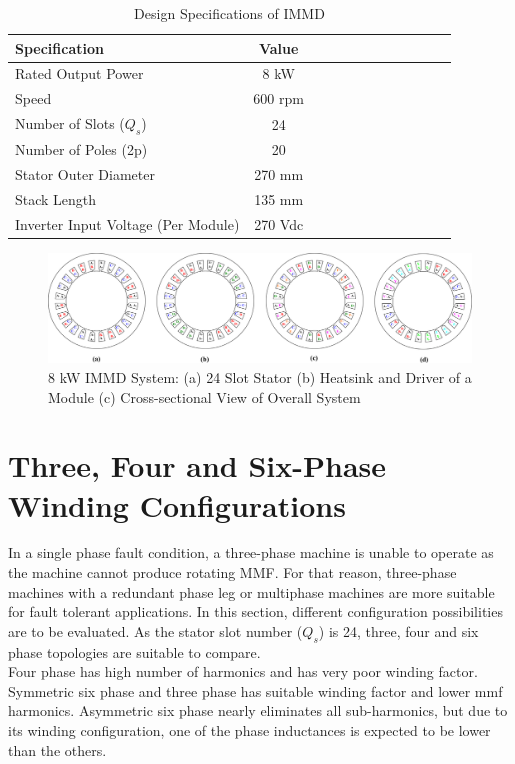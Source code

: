 \documentclass[a4paper,11pt]{article}
\begin{document}
\begin{table}[ht!]
\centering
 \caption{Design Specifications of IMMD}
\label{kd}
\begin{tabularx}{0.5\textwidth}{@{}l*{10}{C}c@{}}

\toprule
Specification  &  Value \\ 
\midrule
Rated Output Power & 8 kW \\ 
Speed & 600 rpm \\ 
Number of Slots ($Q_s$) & 24 \\
Number of Poles (2p) & 20 \\
Stator Outer Diameter & 270 mm \\
Stack Length & 135 mm \\
Inverter Input Voltage (Per Module) & 270 Vdc \\

\bottomrule
\end{tabularx}
\end{table}

\begin{figure}[ht!]
    \centering
    \includegraphics{windings.png}
    \caption{8 kW IMMD System: (a) 24 Slot Stator (b) Heatsink and Driver of a Module (c) Cross-sectional View of Overall System}
    \label{fig:immd}
\end{figure}

\section{\normalsize\textbf{Three, Four and Six-Phase Winding Configurations}}
In a single phase fault condition, a three-phase machine is unable to operate as the machine cannot produce rotating MMF. For that reason, three-phase machines with a redundant phase leg or multiphase machines are more suitable for fault tolerant applications. %
In this section, different configuration possibilities are to be evaluated. As the stator slot number ($Q_s$) is 24, three, four and six phase topologies are suitable to compare.\\
Four phase has high number of harmonics and has very poor winding factor.\\
Symmetric six phase and three phase has suitable winding factor and lower mmf harmonics.
Asymmetric six phase nearly eliminates all sub-harmonics, but due to its winding configuration, one of the phase inductances is expected to be lower than the others.
\end{document}
